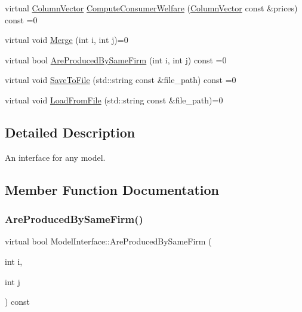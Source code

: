 \begin{DoxyCompactItemize}
\item 
virtual \hyperlink{classColumnVector}{Column\+Vector} \hyperlink{classModelInterface_a094ebb85618fb13bf38f6faff1f5dd7b}{Compute\+Consumer\+Welfare} (\hyperlink{classColumnVector}{Column\+Vector} const \&prices) const =0
\item 
virtual void \hyperlink{classModelInterface_a9aa52643da1fe9e74750e31a6c6ec469}{Merge} (int i, int j)=0
\item 
virtual bool \hyperlink{classModelInterface_abbc3c44c6d41b596b6201a9e61e1ff83}{Are\+Produced\+By\+Same\+Firm} (int i, int j) const =0
\item 
virtual void \hyperlink{classModelInterface_ab5709db8ecb96fd9efd02f4777d5502a}{Save\+To\+File} (std\+::string const \&file\+\_\+path) const =0
\item 
virtual void \hyperlink{classModelInterface_a7f408fdb15c10ce8cabf6b942bbc9c38}{Load\+From\+File} (std\+::string const \&file\+\_\+path)=0
\end{DoxyCompactItemize}


\subsection{Detailed Description}
An interface for any model. 

\subsection{Member Function Documentation}
\mbox{\label{classModelInterface_abbc3c44c6d41b596b6201a9e61e1ff83}} 
\subsubsection{\texorpdfstring{Are\+Produced\+By\+Same\+Firm()}{AreProducedBySameFirm()}}
{\footnotesize\ttfamily virtual bool Model\+Interface\+::\+Are\+Produced\+By\+Same\+Firm (\begin{DoxyParamCaption}\item[{int}]{i,  }\item[{int}]{j }\end{DoxyParamCaption}) const\hspace{0.3cm}{\ttfamily [pure virtual]}}

